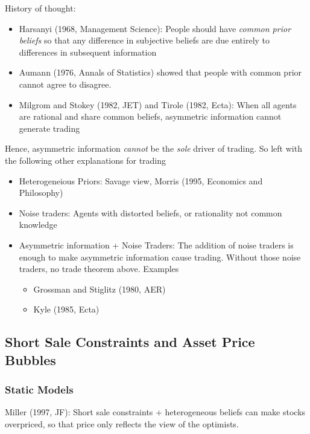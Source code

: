 \documentclass[12pt]{article}
\theoremstyle{plain}
\theoremstyle{definition}
\theoremstyle{remark}
\begin{document}
History of thought:
\begin{itemize}
  \item Harsanyi (1968, Management Science):
    People should have \emph{common prior beliefs} so that any
    difference in subjective beliefs are due entirely to differences in
    subsequent information
  \item Aumann (1976, Annals of Statistics) showed that people with
    common prior cannot agree to disagree.
  \item Milgrom and Stokey (1982, JET) and Tirole (1982, Ecta):
    When all agents are rational and share common beliefs, asymmetric
    information cannot generate trading
\end{itemize}
Hence, asymmetric information \emph{cannot} be the \emph{sole} driver of
trading. So left with the following other explanations for trading
\begin{itemize}
  \item Heterogeneious Priors:
    Savage view, Morris (1995, Economics and Philosophy)
  \item Noise traders: Agents with distorted beliefs, or rationality not
    common knowledge
  \item Asymmetric information + Noise Traders:
    The addition of noise traders is enough to make asymmetric
    information cause trading. Without those noise traders, no trade
    theorem above.
    Examples
    \begin{itemize}
      \item Grossman and Stiglitz (1980, AER)
      \item Kyle (1985, Ecta)
    \end{itemize}
\end{itemize}


\clearpage
\subsection{Short Sale Constraints and Asset Price Bubbles}

\subsubsection{Static Models}

Miller (1997, JF): Short sale constraints + heterogeneous beliefs can
make stocks overpriced, so that price only reflects the view of the
optimists.
\end{document}
